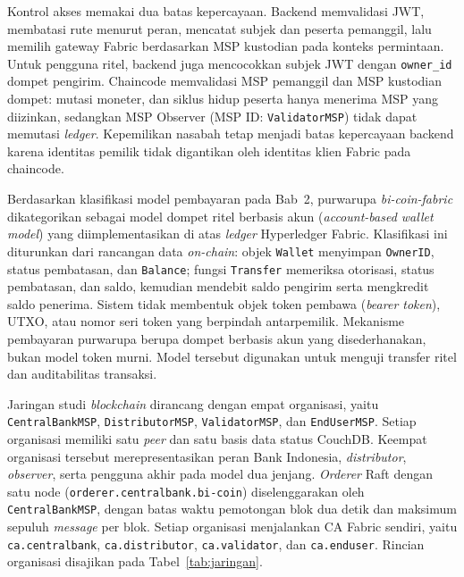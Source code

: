 Kontrol akses memakai dua batas kepercayaan. Backend memvalidasi JWT, membatasi
rute menurut peran, mencatat subjek dan peserta pemanggil, lalu memilih gateway
Fabric berdasarkan MSP kustodian pada konteks permintaan. Untuk pengguna ritel,
backend juga mencocokkan subjek JWT dengan \texttt{owner\_id} dompet pengirim.
Chaincode memvalidasi MSP pemanggil dan MSP kustodian dompet: mutasi moneter,
dan siklus hidup peserta hanya menerima MSP yang diizinkan, sedangkan
MSP Observer (MSP ID: \texttt{ValidatorMSP}) tidak dapat memutasi \textit{ledger}. Kepemilikan nasabah tetap menjadi
batas kepercayaan backend karena identitas pemilik tidak digantikan oleh
identitas klien Fabric pada chaincode.

Berdasarkan klasifikasi model pembayaran pada Bab~2, purwarupa
\textit{bi-coin-fabric} dikategorikan sebagai model dompet ritel berbasis akun
(\textit{account-based wallet model}) yang diimplementasikan di atas
\textit{ledger} Hyperledger Fabric. Klasifikasi ini diturunkan dari rancangan
data \textit{on-chain}: objek \texttt{Wallet} menyimpan \texttt{OwnerID},
status pembatasan, dan \texttt{Balance}; fungsi \texttt{Transfer} memeriksa
otorisasi, status pembatasan, dan saldo, kemudian mendebit saldo pengirim
serta mengkredit saldo penerima. Sistem tidak membentuk objek token pembawa
(\textit{bearer token}), UTXO, atau nomor seri token yang berpindah antarpemilik.
Mekanisme pembayaran purwarupa berupa dompet berbasis akun yang disederhanakan,
bukan model token murni. Model tersebut digunakan untuk menguji transfer ritel
dan auditabilitas transaksi.



Jaringan studi \textit{blockchain} dirancang dengan empat organisasi, yaitu
\texttt{CentralBankMSP}, \texttt{DistributorMSP}, \texttt{ValidatorMSP}, dan
\texttt{EndUserMSP}. Setiap organisasi memiliki satu \textit{peer} dan satu basis
data status CouchDB. Keempat organisasi tersebut merepresentasikan peran Bank
Indonesia, \textit{distributor}, \textit{observer}, serta pengguna akhir pada model dua jenjang.
\textit{Orderer} Raft dengan satu node (\texttt{orderer.centralbank.bi-coin})
diselenggarakan oleh \texttt{CentralBankMSP},
dengan batas waktu pemotongan blok dua detik dan maksimum sepuluh
\textit{message} per blok. Setiap organisasi menjalankan CA Fabric sendiri, yaitu \texttt{ca.centralbank}, \texttt{ca.distributor}, \texttt{ca.validator}, dan \texttt{ca.enduser}. Rincian organisasi disajikan pada
Tabel~\ref{tab:jaringan}.

